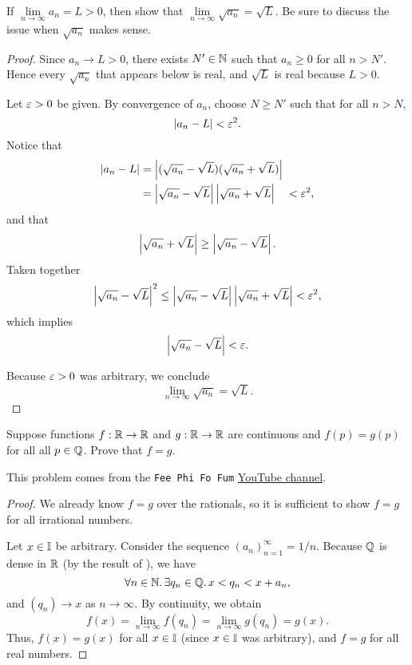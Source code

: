 \begin{problem}
  
  If $\lim\limits_{n \to \infty} a_n = L > 0$, then show that $\lim\limits_{n \to \infty} \sqrt{a_n} = \sqrt{L}$. Be sure to discuss
  the issue when $\sqrt{a_{n}}$ makes sense.

  \begin{proof}
    Since $a_{n} \to L > 0$, there exists $N' \in \mathbb{N}$ such that
    $a_{n} \ge 0$ for all $n > N'$.  Hence every $\sqrt{a_{n}}$ that appears
    below is real, and $\sqrt{L}$ is real because $L > 0$.

    Let $\varepsilon > 0$ be given. By convergence of $a_{n}$, choose $N \ge N'$ such that
    for all $n > N$,
    \[
      \left\lvert a_{n} - L \right\rvert< \varepsilon^{2}.
    \]
    Notice that 
    \begin{align*}
      \left\lvert a_{n} - L \right\rvert &= \left\lvert (\sqrt{a_n} - \sqrt{L})(\sqrt{a_n} + \sqrt{L}) \right\rvert \\
                      &= \left\lvert \sqrt{a_n} - \sqrt{L} \right\rvert\left\lvert \sqrt{a_n} + \sqrt{L} \right\rvert \quad < \varepsilon^{2},
    \end{align*}
    and that
    \[
      \left\lvert \sqrt{a_{n}} + \sqrt{L} \right\rvert \geq \left\lvert \sqrt{a_n} - \sqrt{L} \right\rvert.
    \]
    Taken together
    \[
      \left\lvert \sqrt{a_{n}} - \sqrt{L} \right\rvert^{2} \leq \left\lvert \sqrt{a_{n}} - \sqrt{L} \right\rvert\left\lvert \sqrt{a_{n}} + \sqrt{L} \right\rvert < \varepsilon^{2},
    \]
    which implies
    \[
      \left\lvert \sqrt{a_{n}} - \sqrt{L} \right\rvert < \varepsilon.
    \]

    Because $\varepsilon > 0$ was arbitrary, we conclude
    \[
      \lim_{n \to \infty} \sqrt{a_{n}} = \sqrt{L}.
    \]
  \end{proof}

\end{problem}

\begin{problem}
  Suppose functions $f : \mathbb{R} \to \mathbb{R}$ and $g : \mathbb{R} \to \mathbb{R}$ are continuous and $f(p) = g(p)$ for all all $p \in \mathbb{Q}$. Prove that
  $f = g$.

  \begin{callout}
    This problem comes from the \texttt{Fee Phi Fo Fum} \href{https://www.youtube.com/watch?v=OuwLcZQsDoY}{YouTube channel}.
  \end{callout}

  \begin{proof}
    We already know $f = g$ over the rationals, so it is sufficient to show $f = g$ for all irrational numbers.

    Let $x \in \mathbb{I}$ be arbitrary. Consider the sequence $(a_{n})_{n=1}^{\infty} = 1/n$. Because
    $\mathbb{Q}$ is dense in $\mathbb{R}$ (by the result of ), we have
    \[
      \forall n \in \mathbb{N}.\, \exists q_{n} \in \mathbb{Q}.\, x < q_{n} < x + a_{n},
    \]
    and $(q_{n}) \to x$ as $n \to \infty$. By continuity, we obtain
    \[
      f(x) = \lim_{n \to \infty} f(q_{n}) = \lim_{n \to \infty} g(q_{n}) = g(x).
    \]
    Thus, $f(x) = g(x)$ for all $x \in \mathbb{I}$ (since $x \in \mathbb{I}$ was arbitrary), and $f = g$ for all real numbers.
  \end{proof}
\end{problem}

